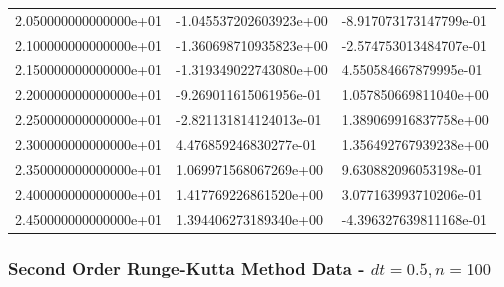 \documentclass[pdf,color]{UoBnote}
\begin{document}
\begin{table}[H]
{\begin{tabular}{l|l|l}
    2.050000000000000e+01 & -1.045537202603923e+00 & -8.917073173147799e-01 \\
    2.100000000000000e+01 & -1.360698710935823e+00 & -2.574753013484707e-01 \\
    2.150000000000000e+01 & -1.319349022743080e+00 & 4.550584667879995e-01  \\
    2.200000000000000e+01 & -9.269011615061956e-01 & 1.057850669811040e+00  \\
    2.250000000000000e+01 & -2.821131814124013e-01 & 1.389069916837758e+00  \\
    2.300000000000000e+01 & 4.476859246830277e-01  & 1.356492767939238e+00  \\
    2.350000000000000e+01 & 1.069971568067269e+00  & 9.630882096053198e-01  \\
    2.400000000000000e+01 & 1.417769226861520e+00  & 3.077163993710206e-01  \\
    2.450000000000000e+01 & 1.394406273189340e+00  & -4.396327639811168e-01 \\
    \end{tabular}
    }
\end{table}

\subsubsection{Second Order Runge-Kutta Method Data - $dt = 0.5, n = 100$}
\end{document}
